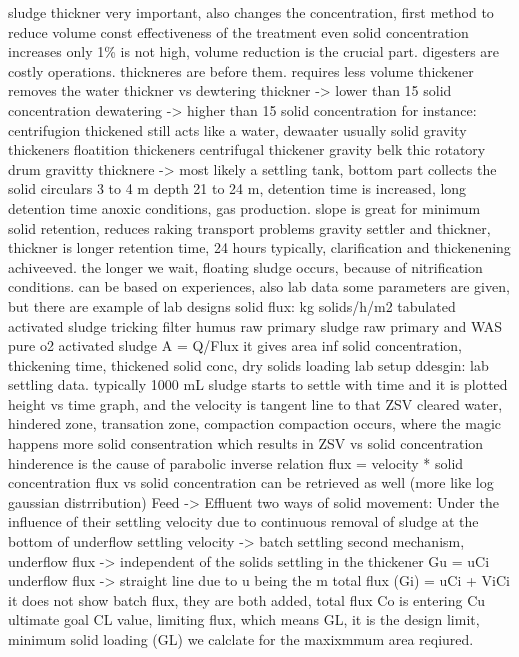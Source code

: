 \documentclass[12pt]{article}
\begin{document}
sludge thickner
very important, also changes the concentration, first method to reduce volume
const effectiveness of the treatment
even solid concentration increases only 1\% is not high, volume reduction is the crucial part.
digesters are costly operations. thickneres are before them. requires less volume
thickener removes the water
thickner vs dewtering
thickner -> lower than 15 solid concentration
dewatering -> higher than 15 solid concentration
for instance: centrifugion
thickened still acts like a water, dewaater usually solid
gravity thickeners
floatition thickeners
centrifugal thickener
gravity belk thic
rotatory drum
gravitty thicknere -> most likely a settling tank, bottom part collects the solid
circulars
3 to 4 m depth 21 to 24 m, detention time is increased, long detention time anoxic conditions, gas production.
slope is great for minimum solid retention, reduces raking transport problems
gravity settler and thickner,
thickner is longer retention time, 24 hours typically, clarification and thickenening achiveeved.
the longer we wait, floating sludge occurs, because of nitrification conditions.
can be based on experiences, also lab data
some parameters are given, but there are example of lab designs
solid flux: kg solids/h/m2 %
tabulated activated sludge
tricking filter humus
raw primary sludge
raw primary and WAS
pure o2 activated sludge
A = Q/Flux
it gives area
inf solid concentration, thickening time, thickened solid conc, dry solids loading
lab setup ddesgin:
lab settling data.
typically 1000 mL
sludge starts to settle with time and it is plotted
height vs time graph, and the velocity is tangent line to that ZSV
cleared water, hindered zone, transation zone, compaction
compaction occurs, where the magic happens
more solid consentration which results in ZSV vs solid concentration
hinderence is the cause of parabolic inverse relation
flux = velocity * solid concentration
flux vs solid concentration can be retrieved as well (more like log gaussian distrribution)
Feed -> Effluent
two ways of solid movement:
Under the influence of their settling velocity
due to continuous removal of sludge at the bottom of underflow
settling velocity -> batch settling
second mechanism, underflow flux -> independent of the solids settling in the thickener
Gu = uCi
underflow flux -> straight line due to u being the m
total flux (Gi) = uCi + ViCi
it does not show batch flux, they are both added, total flux
Co is entering Cu ultimate goal
CL value, limiting flux, which means GL, it is the design limit, minimum solid loading (GL) we calclate for the maxixmmum area reqiured.
\end{document}
